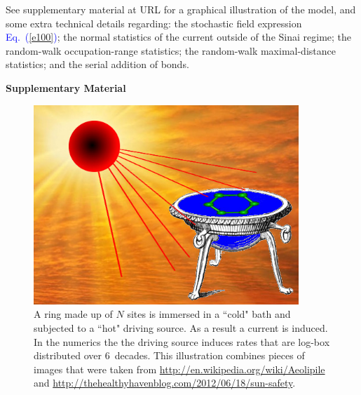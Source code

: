 \documentclass[aps,prl,floats,floatfix,twocolumn]{revtex4}
\newcommand{\Eq}[1]{\textcolor{blue}{Eq.\!\!~(\ref{#1})}}
\begin{document}
\begin{thebibliography}{99}

See supplementary material at URL 
for a graphical illustration of the model,   
and some extra technical details regarding: 
the stochastic field expression \Eq{e100}; 
the normal statistics of the current outside of the Sinai regime; 
the random-walk occupation-range statistics;
the random-walk maximal-distance statistics;
and the serial addition of bonds. 



\end{thebibliography}






\clearpage
\onecolumngrid

\begin{center}
{\LARGE\bf Supplementary Material}
\end{center}


\begin{figure}[h!]
\centering
\includegraphics[width=10cm]{SunBath}
\caption{
A ring made up of $N$ sites is immersed in a ``cold" bath 
and subjected to a ``hot" driving source. 
As a result a current is induced.  
%
In the numerics the the driving source induces 
rates that are log-box distributed over 6~decades. 
%
This illustration combines pieces of images 
that were taken from \url{http://en.wikipedia.org/wiki/Aeolipile} 
and \url{http://thehealthyhavenblog.com/2012/06/18/sun-safety}.
} 
\label{f0}
\end{figure}
\end{document}
